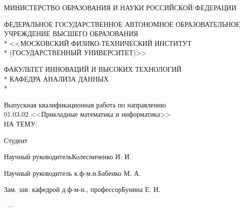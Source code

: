 \thispagestyle{empty}%
\begin{center}%

МИНИСТЕРСТВО ОБРАЗОВАНИЯ И НАУКИ РОССИЙСКОЙ ФЕДЕРАЦИИ \\
\bigskip

\MakeUppercase{Федеральное государственное автономное образовательное учреждение высшего образования} \\*
<<МОСКОВСКИЙ ФИЗИКО-ТЕХНИЧЕСКИЙ ИНСТИТУТ \\*
(ГОСУДАРСТВЕННЫЙ УНИВЕРСИТЕТ)>> \\
\bigskip

ФАКУЛЬТЕТ ИННОВАЦИЙ И ВЫСОКИХ ТЕХНОЛОГИЙ \\*
КАФЕДРА АНАЛИЗА ДАННЫХ \\*
\hrulefill
\end{center}%

\begin{center}%
\vspace{0pt plus3fill} %
\large
Выпускная квалификационная работа по направлению \\
01.03.02 <<Прикладные математика и информатика>> \\
НА ТЕМУ:
\vspace{0pt plus2fill}

\textbf {\large \thesisTitle}
\end{center}%
%
\vspace{0pt plus4fill} %
\noindent
Студент\hrulefill\thesisAuthorShort
\medskip

\noindent
Научный руководитель\hrulefill{}Колесниченко И. И.%
\medskip

\noindent
Научный руководитель к.ф-м.н.\hrulefill{}Бабенко М. А.%
\medskip

\noindent
Зам. зав. кафедрой д.ф-м-н., профессор\hrulefill{}Бунина Е. И.%
%
\vspace{0pt plus1.5fill} %
\begin{center}%
{\thesisCity~--- \thesisYear}
\end{center}%
\newpage
